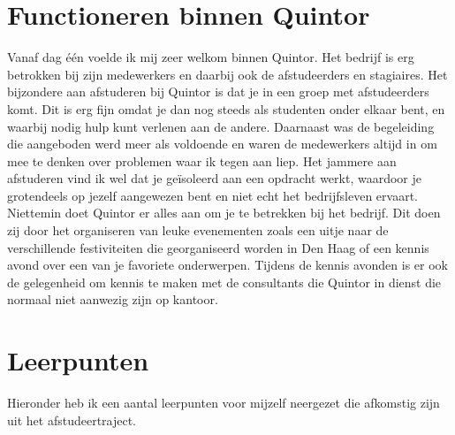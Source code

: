 \section{Functioneren binnen Quintor}

Vanaf dag één voelde ik mij zeer welkom binnen Quintor. Het bedrijf is erg betrokken bij zijn medewerkers en daarbij ook de afstudeerders en stagiaires. Het bijzondere aan afstuderen bij Quintor is dat je in een groep met afstudeerders komt. Dit is erg fijn omdat je dan nog steeds als studenten onder elkaar bent, en waarbij nodig hulp kunt verlenen aan de andere. Daarnaast was de begeleiding die aangeboden werd meer als voldoende en waren de medewerkers altijd in om mee te denken over problemen waar ik tegen aan liep. Het jammere aan afstuderen vind ik wel dat je geïsoleerd aan een opdracht werkt, waardoor je grotendeels op jezelf aangewezen bent en niet echt het bedrijfsleven ervaart. Niettemin doet Quintor er alles aan om je te betrekken bij het bedrijf. Dit doen zij door het organiseren van leuke evenementen zoals een uitje naar de verschillende festiviteiten die georganiseerd worden in Den Haag of een kennis avond over een van je favoriete onderwerpen. Tijdens de kennis avonden is er ook de gelegenheid om kennis te maken met de consultants die Quintor in dienst die normaal niet aanwezig zijn op kantoor.

\section{Leerpunten}

Hieronder heb ik een aantal leerpunten voor mijzelf neergezet die afkomstig zijn uit het afstudeertraject.

